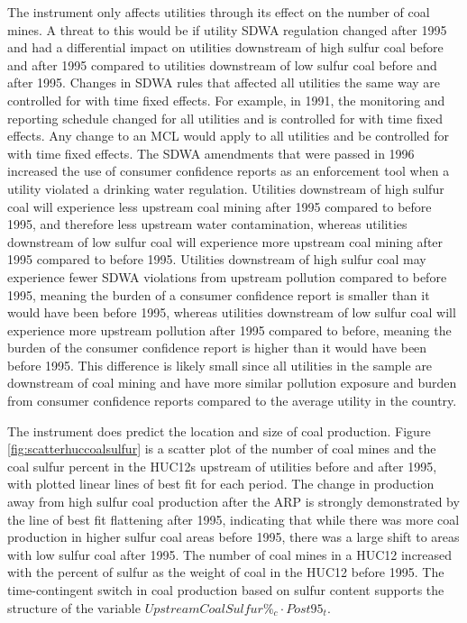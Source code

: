 \documentclass[12pt]{article}
\begin{document}
The instrument only affects utilities through its effect on the number of coal mines. A threat to this would be if utility SDWA regulation changed after 1995 and had a differential impact on utilities downstream of high sulfur coal before and after 1995 compared to utilities downstream of low sulfur coal before and after 1995. Changes in SDWA rules that affected all utilities the same way are controlled for with time fixed effects. For example, in 1991, the monitoring and reporting schedule changed for all utilities and is controlled for with time fixed effects. Any change to an MCL would apply to all utilities and be controlled for with time fixed effects. The SDWA amendments that were passed in 1996 increased the use of consumer confidence reports as an enforcement tool when a utility violated a drinking water regulation. Utilities downstream of high sulfur coal will experience less upstream coal mining after 1995 compared to before 1995, and therefore less upstream water contamination, whereas utilities downstream of low sulfur coal will experience more upstream coal mining after 1995 compared to before 1995. Utilities downstream of high sulfur coal may experience fewer SDWA violations from upstream pollution compared to before 1995, meaning the burden of a consumer confidence report is smaller than it would have been before 1995, whereas utilities downstream of low sulfur coal will experience more upstream pollution after 1995 compared to before, meaning the burden of the consumer confidence report is higher than it would have been before 1995. This difference is likely small since all utilities in the sample are downstream of coal mining and have more similar pollution exposure and burden from consumer confidence reports compared to the average utility in the country.


The instrument does predict the location and size of coal production. Figure \ref{fig:scatterhuccoalsulfur} is a scatter plot of the number of coal mines and the coal sulfur percent in the HUC12s upstream of utilities before and after 1995, with plotted linear lines of best fit for each period. The change in production away from high sulfur coal production after the ARP is strongly demonstrated by the line of best fit flattening after 1995, indicating that while there was more coal production in higher sulfur coal areas before 1995, there was a large shift to areas with low sulfur coal after 1995. The number of coal mines in a HUC12 increased with the percent of sulfur as the weight of coal in the HUC12 before 1995. The time-contingent switch in coal production based on sulfur content supports the structure of the variable $UpstreamCoalSulfur\%_c \cdot Post95_t$.
\end{document}
